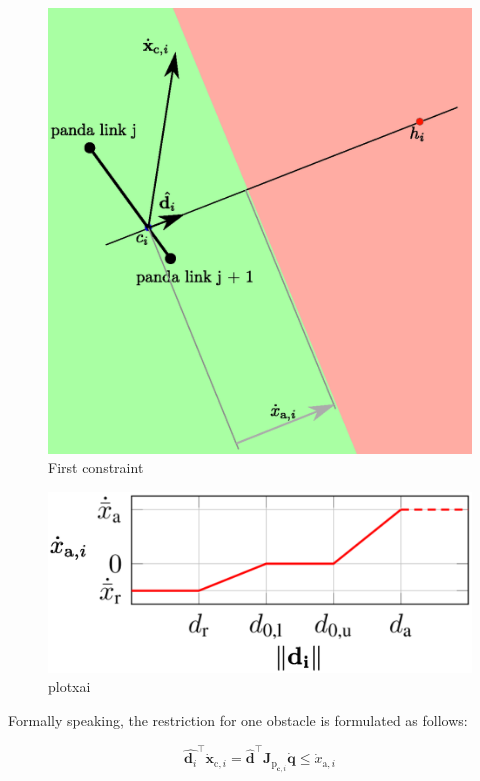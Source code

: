 \begin{figure}[htbp]
    \caption[]{
    First constraint
    }
    \begin{center}
    \includegraphics[width=120mm]{figs/firstconstraint.eps}
    \end{center}
    \label{fig:firstconstraint}
\end{figure}

\begin{figure}[htbp]
    \caption[]{
    plotxai
    }
    \begin{center}
    \includegraphics[width=120mm]{figs/plotxai.eps}
    \end{center}
    \label{fig:plotxai}
\end{figure}

Formally speaking, the restriction for one obstacle is formulated as follows:

\begin{equation*}
    \hat{\mathbf{d}_i}^{\top} \dot{\mathbf{x}}_{\mathrm{c}, i} =
    \hat{\mathbf{d}}^{\top} \mathbf{J}_{\mathrm{p}_{\mathbf{c}, i}} \dot{\mathbf{q}} \leq
    \dot{x}_{\mathrm{a}, i}
\end{equation*}

